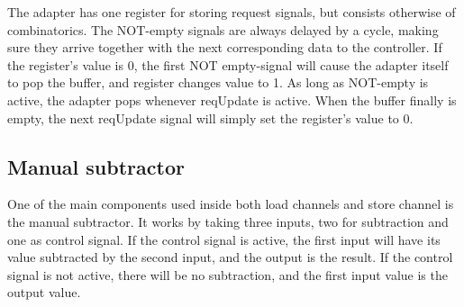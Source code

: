 \begin{appendix}
The adapter has one register for storing request signals, but consists otherwise of combinatorics.
The NOT-empty signals are always delayed by a cycle, making sure they arrive together with the next corresponding data to the controller.
If the register's value is 0, the first NOT empty-signal will cause the adapter itself to pop the buffer, and register changes value to 1.
As long as NOT-empty is active, the adapter pops whenever reqUpdate is active.
When the buffer finally is empty, the next reqUpdate signal will simply set the register's value to 0.

\subsection{Manual subtractor}
One of the main components used inside both load channels and store channel is the manual subtractor.
It works by taking three inputs, two for subtraction and one as control signal.
If the control signal is active, the first input will have its value subtracted by the second input, and the output is the result.
If the control signal is not active, there will be no subtraction, and the first input value is the output value. 


\end{appendix}
